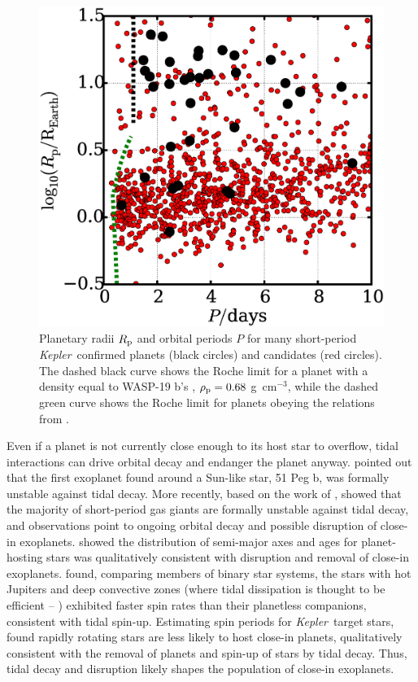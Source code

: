 \documentclass{aastex}
\newcommand{\kepler}{{\it Kepler}}
\begin{document}
\begin{figure}
\includegraphics[width=\textwidth]{Rp_vs_P}
\caption{Planetary radii $R_{\rm p}$ and orbital periods $P$ for many short-period \kepler\ confirmed planets (black circles) and candidates (red circles). The dashed black curve shows the Roche limit for a planet with a density equal to WASP-19 b's \citep{2010ApJ...708..224H}, $\rho_{\rm p} = 0.68$ g\ cm$^{-3}$, while the dashed green curve shows the Roche limit for planets obeying the relations from \citet{2014ApJ...783L...6W}.}
\label{fig:Rp_vs_P}
\end{figure}

Even if a planet is not currently close enough to its host star to overflow, tidal interactions can drive orbital decay and endanger the planet anyway. \citet{1996ApJ...470.1187R} pointed out that the first exoplanet found around a Sun-like star, 51 Peg b, was formally unstable against tidal decay. More recently, based on the work of \citet{1973ApJ...180..307C}, \citet{2009ApJ...692L...9L} showed that the majority of short-period gas giants are formally unstable against tidal decay, and observations point to ongoing orbital decay and possible disruption of close-in exoplanets. \citet{2009ApJ...698.1357J} showed the distribution of semi-major axes and ages for planet-hosting stars was qualitatively consistent with disruption and removal of close-in exoplanets. \citet{2014A&A...565L...1P} found, comparing members of binary star systems, the stars with hot Jupiters and deep convective zones (where tidal dissipation is thought to be efficient -- \citealp{2012ApJ...757...18A}) exhibited faster spin rates than their planetless companions, consistent with tidal spin-up. Estimating spin periods for \kepler\ target stars, \citet{2013ApJ...775L..11M} found rapidly rotating stars are less likely to host close-in planets, qualitatively consistent with the removal of planets and spin-up of stars by tidal decay. Thus, tidal decay and disruption likely shapes the population of close-in exoplanets. 
\end{document}
